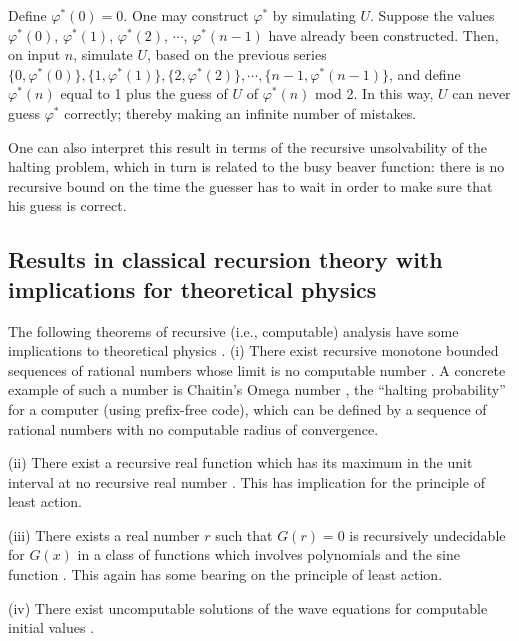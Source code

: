 \documentclass[rmp,amsfonts,showpacs,showkeys]{revtex4}
\begin{document}
Define $\varphi^\ast (0)=0$.
One may construct $\varphi^\ast $ by simulating $U$. Suppose the values
$\varphi^\ast (0)$, $\varphi^\ast (1)$, $\varphi^\ast (2)$, $\cdots$,
$\varphi^\ast (n-1)$ have already been constructed. Then, on input $n$,
simulate $U$, based on the previous series
$
\{0, \varphi^\ast (0)\},
\{1, \varphi^\ast (1)\},
\{2, \varphi^\ast (2)\},
\cdots ,
\{n-1, \varphi^\ast (n-1)\}$,
 and define
$\varphi^\ast (n)$ equal to 1 plus the guess of $U$ of
$\varphi^\ast (n)$ mod 2. In this way, $U$ can never guess
$\varphi^\ast $ correctly; thereby making an infinite number of mistakes.

One can also interpret this result in terms of the recursive
unsolvability of the halting problem, which in turn is related to the busy beaver function:
there is no recursive bound on the
time the guesser has to wait in order to make sure that his guess is
correct.


\subsection{Results in classical recursion theory with implications for theoretical physics}


The following theorems of recursive (i.e., computable) analysis have some implications to theoretical physics \cite{kreisel}.
(i)
There exist recursive monotone bounded sequences of rational numbers
whose limit is no computable number
\cite{Specker49}.
A concrete example of such a number is Chaitin's Omega number \cite{chaitin3,calude:02,calude-dinneen06},
the ``halting probability'' for a computer (using prefix-free code),
which can be defined by a sequence of rational numbers
with no computable radius of convergence.

(ii)
There exist a recursive real function which has its maximum in the unit interval
at no recursive real number \cite{Specker57}.
This has implication for the principle of least action.

(iii)
There exists a real number $r$ such that $G(r) = 0$ is recursively undecidable for $G(x)$
in a class of functions which involves polynomials and the sine function
\cite{wang}.
This again has some bearing on  the principle of least action.

(iv)
There exist uncomputable solutions of the wave equations for computable initial values
\cite{pr1,bridges1}.

\end{document}
